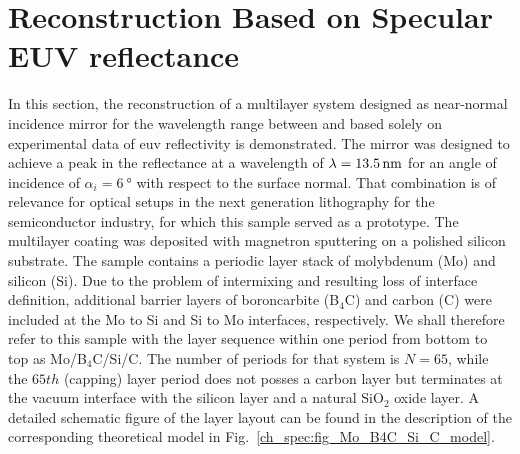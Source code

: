 \section{Reconstruction Based on Specular EUV reflectance} \label{ch_spec:sec_PTB17}

In this section, the reconstruction of a multilayer system designed as near-normal incidence mirror for the wavelength range between  and  based solely on experimental data of \gls{euv} reflectivity is demonstrated. The mirror was designed to achieve a peak in the reflectance at a wavelength of $\lambda=\nm{13.5}$ for an angle of incidence of $\alpha_i = \SI{6}{\degree}$ with respect to the surface normal. That combination is of relevance for optical setups in the next generation lithography for the semiconductor industry, for which this sample served as a prototype. The multilayer coating was deposited with magnetron sputtering on a polished silicon substrate. The sample contains a periodic layer stack of molybdenum (Mo) and silicon (Si). Due to the problem of intermixing and resulting loss of interface definition, additional barrier layers of boroncarbite (B$_4$C) and carbon (C) were included at the Mo to Si and Si to Mo interfaces, respectively. We shall therefore refer to this sample with the layer sequence within one period from bottom to top as Mo/B$_4$C/Si/C. The number of periods for that system is $N=65$, while the $65th$ (capping) layer period does not posses a carbon layer but terminates at the vacuum interface with the silicon layer and a natural SiO$_2$ oxide layer. A detailed schematic figure of the layer layout can be found in the description of the corresponding theoretical model in Fig.~\ref{ch_spec:fig_Mo_B4C_Si_C_model}.


